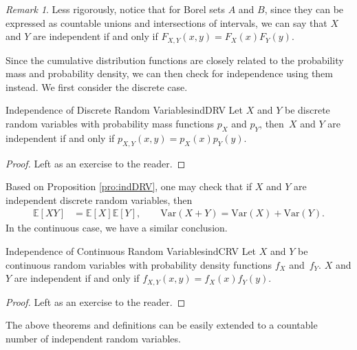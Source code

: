 \documentclass[math]{amznotes}
\theoremstyle{remark}
\newtheorem*{remark}{Remark}
\newcommand{\0}{\mathbf{0}}
\newcommand{\1}{\mathbf{1}}
\begin{document}
\begin{notebox}
    \begin{remark}
        Less rigorously, notice that for Borel sets $A$ and $B$, since they can be expressed as countable unions and intersections of intervals, we can say that $X$ and $Y$ are independent if and only if $F_{X, Y}(x, y) = F_X(x)F_Y(y)$.
    \end{remark}
\end{notebox}
Since the cumulative distribution functions are closely related to the probability mass and probability density, we can then check for independence using them instead. We first consider the discrete case.
\begin{probox}{Independence of Discrete Random Variables}{indDRV}
    Let $X$ and $Y$ be discrete random variables with probability mass functions $p_X$ and $p_Y$, then~$X$ and $Y$ are independent if and only if $p_{X, Y}(x, y) = p_X(x)p_Y(y)$.
    \tcblower
    \begin{proof}
        Left as an exercise to the reader.
    \end{proof}
\end{probox}
Based on Proposition \ref{pro:indDRV}, one may check that if $X$ and $Y$ are independent discrete random variables, then 
\begin{align*}
    \mathbb{E}[XY] & = \mathbb{E}[X]\mathbb{E}[Y], \qquad \mathrm{Var}(X + Y) = \mathrm{Var}(X) + \mathrm{Var}(Y).
\end{align*}
In the continuous case, we have a similar conclusion.
\begin{thmbox}{Independence of Continuous Random Variables}{indCRV}
    Let $X$ and $Y$ be continuous random variables with probability density functions $f_X$ and~$f_Y$. $X$ and $Y$ are independent if and only if $f_{X, Y}(x, y) = f_X(x)f_Y(y)$.
    \tcblower
    \begin{proof}
        Left as an exercise to the reader.
    \end{proof}
\end{thmbox}
The above theorems and definitions can be easily extended to a countable number of independent random variables.
\end{document}
